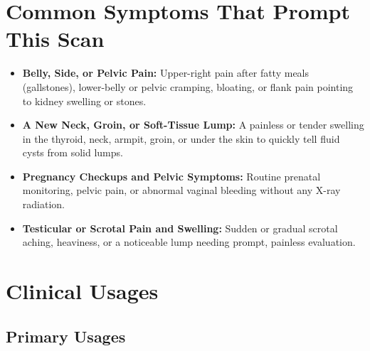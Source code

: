 \section{Common Symptoms That Prompt This Scan}
\begin{itemize}
    \item \textbf{Belly, Side, or Pelvic Pain:} Upper-right pain after fatty meals (gallstones), lower-belly or pelvic cramping, bloating, or flank pain pointing to kidney swelling or stones.
    \item \textbf{A New Neck, Groin, or Soft-Tissue Lump:} A painless or tender swelling in the thyroid, neck, armpit, groin, or under the skin to quickly tell fluid cysts from solid lumps.
    \item \textbf{Pregnancy Checkups and Pelvic Symptoms:} Routine prenatal monitoring, pelvic pain, or abnormal vaginal bleeding without any X-ray radiation.
    \item \textbf{Testicular or Scrotal Pain and Swelling:} Sudden or gradual scrotal aching, heaviness, or a noticeable lump needing prompt, painless evaluation.
\end{itemize}

\section{Clinical Usages}

\subsection{Primary Usages}

